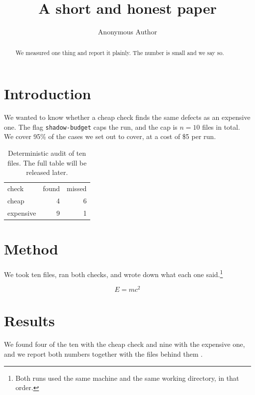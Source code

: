 \documentclass[sigconf,screen]{acmart}
\begin{document}
\title{A short and honest paper}
\author{Anonymous Author}

\begin{abstract}
We measured one thing and report it plainly. The number is small and we say so.
\end{abstract}

\section{Introduction}
\label{sec:intro}
We wanted to know whether a cheap check finds the same defects as an expensive one.
The flag \texttt{shadow-budget} caps the run, and the cap is $n = 10$ files in total.
We cover 95\% of the cases we set out to cover, at a cost of \$5 per run.

\begin{table}[t]
\caption{Deterministic audit of ten files. The full table will be released later.}
\label{tab:results}
\begin{tabular}{lrr}
check & found & missed \\
cheap & 4 & 6 \\
expensive & 9 & 1 \\
\end{tabular}
\end{table}

\section{Method}
We took ten files, ran both checks, and wrote down what each one said.\footnote{Both
runs used the same machine and the same working directory, in that order.}

\[
  E = m c^2
\]

\section{Results}
We found four of the ten with the cheap check and nine with the expensive one, and we
report both numbers together with the files behind them \cite{someone2020}.


\end{document}
